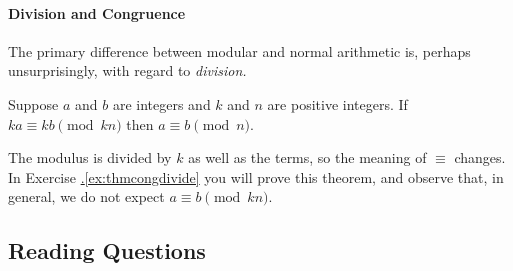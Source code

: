\paragraph{Division and Congruence}

The primary difference between modular and normal arithmetic is, perhaps unsurprisingly, with regard to \emph{division.}

\begin{thm}\label{thm:congdivide}
Suppose $a$ and $b$ are integers and $k$ and $n$ are positive integers. If $ka\equiv kb\pmod{kn}$ then $a\equiv b\pmod n$.
\end{thm}

\noindent The modulus is divided by $k$ as well as the terms, so the meaning of $\equiv$ changes. In Exercise \hyperref[ex:thmcongdivide]{\thesubsection.\ref*{ex:thmcongdivide}} you will prove this theorem, and observe that, in general, we do not expect $a\equiv b\pmod {kn}$.




\subsection*{Reading Questions}

